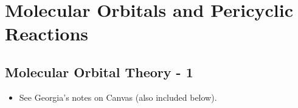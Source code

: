 \documentclass[../notes.tex]{subfiles}
\begin{document}
\chapter{Molecular Orbitals and Pericyclic Reactions}
\setcounter{section}{9}
\section{Molecular Orbital Theory - 1}
\begin{itemize}
    \item {}See Georgia's notes on Canvas (also included below).
\end{itemize}


\end{document}

